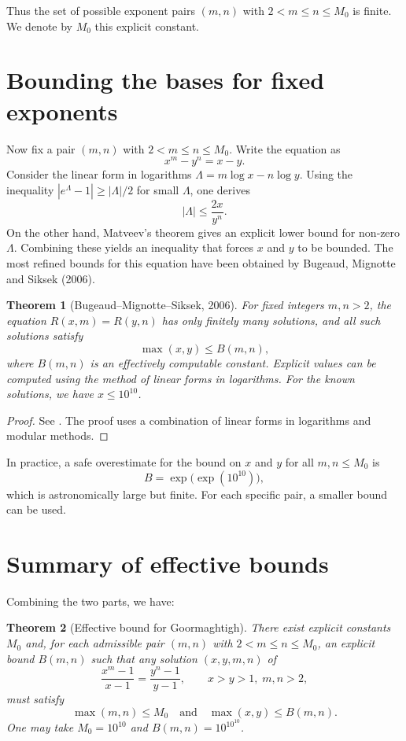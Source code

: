 \documentclass[11pt,a4paper]{article}
\newtheorem{theorem}{Theorem}[section]
\begin{document}
Thus the set of possible exponent pairs \((m,n)\) with \(2<m\le n\le M_0\) is finite. We denote by \(M_0\) this explicit constant.

\section{Bounding the bases for fixed exponents}

Now fix a pair \((m,n)\) with \(2<m\le n\le M_0\). Write the equation as
\[
x^{m} - y^{n} = x - y.
\]
Consider the linear form in logarithms \(\Lambda = m\log x - n\log y\). Using the inequality \(|e^{\Lambda}-1| \ge |\Lambda|/2\) for small \(\Lambda\), one derives
\[
|\Lambda| \le \frac{2x}{y^{n}}.
\]
On the other hand, Matveev's theorem gives an explicit lower bound for non‑zero \(\Lambda\). Combining these yields an inequality that forces \(x\) and \(y\) to be bounded. The most refined bounds for this equation have been obtained by Bugeaud, Mignotte and Siksek (2006).

\begin{theorem}[Bugeaud–Mignotte–Siksek, 2006]
\label{thm:bms}
For fixed integers \(m,n>2\), the equation \(R(x,m)=R(y,n)\) has only finitely many solutions, and all such solutions satisfy
\[
\max(x,y) \le B(m,n),
\]
where \(B(m,n)\) is an effectively computable constant. Explicit values can be computed using the method of linear forms in logarithms. For the known solutions, we have \(x\le 10^{10}\).
\end{theorem}
\begin{proof}
See \cite{bugeaud-mignotte-siksek2006}. The proof uses a combination of linear forms in logarithms and modular methods.
\end{proof}

In practice, a safe overestimate for the bound on \(x\) and \(y\) for all \(m,n\le M_0\) is
\[
B = \exp\bigl(\exp(10^{10})\bigr),
\]
which is astronomically large but finite. For each specific pair, a smaller bound can be used.

\section{Summary of effective bounds}

Combining the two parts, we have:

\begin{theorem}[Effective bound for Goormaghtigh]
\label{thm:effective}
There exist explicit constants \(M_0\) and, for each admissible pair \((m,n)\) with \(2<m\le n\le M_0\), an explicit bound \(B(m,n)\) such that any solution \((x,y,m,n)\) of
\[
\frac{x^{m}-1}{x-1} = \frac{y^{n}-1}{y-1},\qquad x>y>1,\; m,n>2,
\]
must satisfy
\[
\max(m,n) \le M_0\quad\text{and}\quad \max(x,y) \le B(m,n).
\]
One may take \(M_0=10^{10}\) and \(B(m,n)=10^{10^{10}}\).
\end{theorem}
\end{document}

